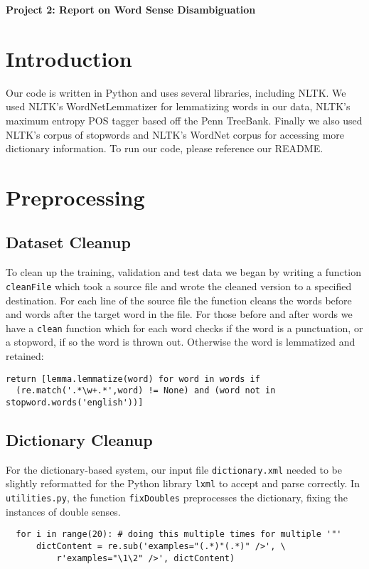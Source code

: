 \documentclass{article}
\begin{document}
\begin{center}\textbf{Project 2: Report on Word Sense Disambiguation}\end{center}

\section{Introduction}

Our code is written in Python and uses several libraries, including NLTK. We used NLTK's WordNetLemmatizer for lemmatizing words in our data, NLTK's maximum entropy POS tagger based off the Penn TreeBank. Finally we also used NLTK's corpus of stopwords and NLTK's WordNet corpus for accessing more dictionary information. To run our code, please reference our README.

\section{Preprocessing}

\subsection{Dataset Cleanup}

To clean up the training, validation and test data we began by writing a function \texttt{cleanFile} which took a source file and wrote the cleaned version to a specified destination. For each line of the source file the function cleans the words before and words after the target word in the file. For those before and after words we have a \texttt{clean} function which for each word checks if the word is a punctuation, or a stopword, if so the word is thrown out. Otherwise the word is lemmatized and retained:
{\small
\begin{verbatim}
return [lemma.lemmatize(word) for word in words if
  (re.match('.*\w+.*',word) != None) and (word not in stopword.words('english'))]
\end{verbatim}
}

\subsection{Dictionary Cleanup}
For the dictionary-based system, our input file \texttt{dictionary.xml} needed to be slightly reformatted for the Python library \texttt{lxml} to accept and parse correctly. In \texttt{utilities.py}, the function \texttt{fixDoubles} preprocesses the dictionary, fixing the instances of double senses.
{\small\begin{verbatim}
  for i in range(20): # doing this multiple times for multiple '"'
      dictContent = re.sub('examples="(.*)"(.*)" />', \
          r'examples="\1\2" />', dictContent)
\end{verbatim}}
\end{document}
